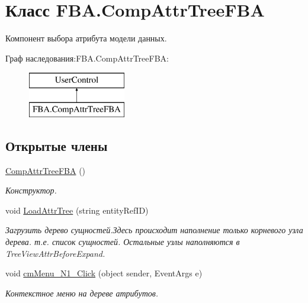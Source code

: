 \hypertarget{class_f_b_a_1_1_comp_attr_tree_f_b_a}{}\section{Класс F\+B\+A.\+Comp\+Attr\+Tree\+F\+BA}
\label{class_f_b_a_1_1_comp_attr_tree_f_b_a}


Компонент выбора атрибута модели данных. ~\newline
 


Граф наследования\+:F\+B\+A.\+Comp\+Attr\+Tree\+F\+BA\+:\begin{figure}[H]
\begin{center}
\leavevmode
\includegraphics[height=2.000000cm]{class_f_b_a_1_1_comp_attr_tree_f_b_a}
\end{center}
\end{figure}
\subsection*{Открытые члены}
\begin{DoxyCompactItemize}
\item 
\mbox{\hyperlink{class_f_b_a_1_1_comp_attr_tree_f_b_a_ac50d58dd2a9a825bdb7a71cd089b331d}{Comp\+Attr\+Tree\+F\+BA}} ()
\begin{DoxyCompactList}\small\item\em Конструктор. \end{DoxyCompactList}\item 
void \mbox{\hyperlink{class_f_b_a_1_1_comp_attr_tree_f_b_a_a5fd891d0729b77976b56715093a3fda1}{Load\+Attr\+Tree}} (string entity\+Ref\+ID)
\begin{DoxyCompactList}\small\item\em Загрузить дерево сущностей.\+Здесь происходит наполнение только корневого узла дерева. т.\+е. список сущностей. Остальные узлы наполняются в Tree\+View\+Attr\+Before\+Expand. \end{DoxyCompactList}\item 
void \mbox{\hyperlink{class_f_b_a_1_1_comp_attr_tree_f_b_a_ab443216305c354defb9f7f518ab301a0}{cm\+Menu\+\_\+\+N1\+\_\+\+Click}} (object sender, Event\+Args e)
\begin{DoxyCompactList}\small\item\em Контекстное меню на дереве атрибутов. \end{DoxyCompactList}\end{DoxyCompactItemize}
